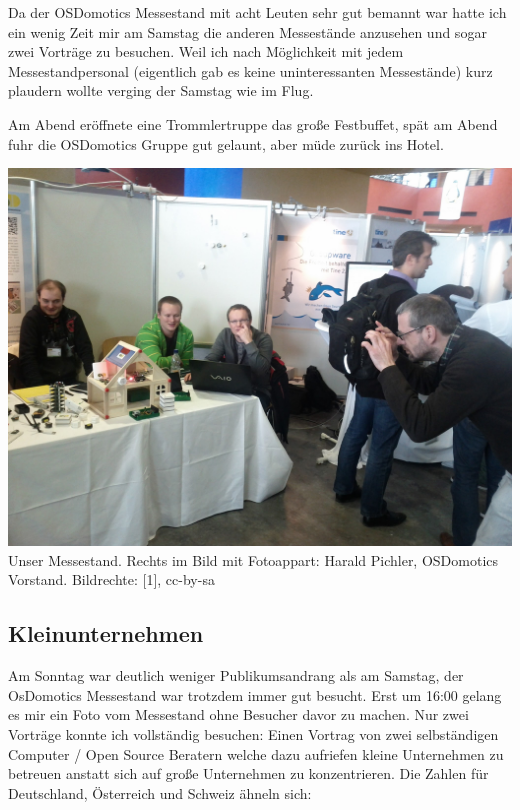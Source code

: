 Da der OSDomotics Messestand mit acht Leuten sehr gut bemannt war hatte ich ein wenig Zeit mir am Samstag die anderen Messestände anzusehen und sogar zwei Vorträge zu besuchen. Weil ich nach Möglichkeit mit jedem Messestandpersonal (eigentlich gab es keine uninteressanten Messestände) kurz plaudern wollte verging der Samstag wie im Flug. 

Am Abend eröffnete eine Trommlertruppe das große Festbuffet, spät am Abend fuhr die OSDomotics Gruppe gut gelaunt, aber müde zurück ins Hotel.

\begin{center}
\includegraphics[width=\linewidth]{chemnitz/chemnitz_puppenhaus.jpg}
\footnotesize{Unser Messestand. Rechts im Bild mit Fotoappart: Harald Pichler, OSDomotics Vorstand. Bildrechte: [1],  cc-by-sa}
\end{center}

\subsection*{Kleinunternehmen}

Am Sonntag war deutlich weniger Publikumsandrang als am Samstag, der OsDomotics Messestand war trotzdem immer gut besucht. Erst um 16:00 gelang es mir ein Foto vom Messestand ohne Besucher davor zu machen. Nur zwei Vorträge konnte ich vollständig besuchen: Einen Vortrag von zwei selbständigen Computer / Open Source Beratern welche dazu aufriefen kleine Unternehmen zu betreuen anstatt sich auf große Unternehmen zu konzentrieren. Die Zahlen für Deutschland, Österreich und Schweiz ähneln sich: 

